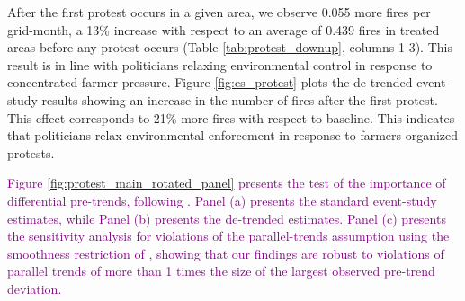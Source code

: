 \documentclass[12pt]{article}
\newcommand{\red}[1]{\textcolor{red}{#1}}
\begin{document}

After the first protest occurs in a given area, we observe 0.055 more fires per grid-month, a 13\% increase with respect to an average of 0.439 fires in treated areas before any protest occurs (Table \ref{tab:protest_downup}, columns 1-3). This result is in line with politicians relaxing environmental control in response to concentrated farmer pressure.
Figure \ref{fig:es_protest} plots the de-trended event-study results showing an increase in the number of fires after the first protest. This effect corresponds to 21\% more fires with respect to baseline. This indicates that politicians relax environmental enforcement in response to farmers organized protests. %


\textcolor{purple}{Figure \ref{fig:protest_main_rotated_panel} presents the test of the importance of differential pre-trends, following \citet{dustmann2022reallocation}. Panel (a) presents the standard event-study estimates, while Panel (b) presents the de-trended estimates. Panel (c) presents the sensitivity analysis for violations of the parallel-trends assumption using the smoothness restriction of \citet{rambachan2023more}, showing that our findings are robust to violations of parallel trends of more than 1 times the size of the largest observed pre-trend deviation.}
\end{document}
